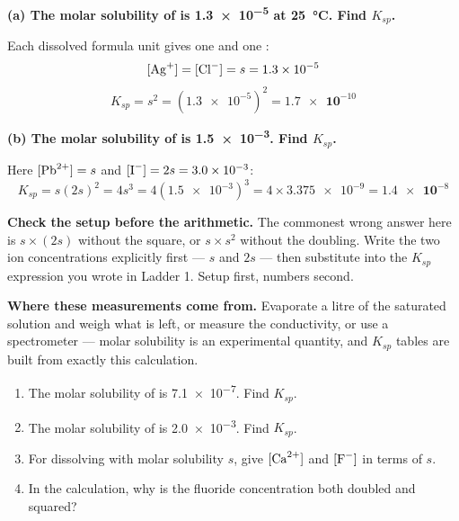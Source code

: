 \documentclass{apchem-worksheet}
\begin{document}
\begin{workedexample}
\textbf{(a) The molar solubility of  is
\SI{1.3e-5}{\Molar} at \SI{25}{\celsius}. Find $K_{sp}$.}

Each dissolved formula unit gives one  and one :
\[ [\ce{Ag+}] = [\ce{Cl-}] = s = \num{1.3e-5} \]
\[ K_{sp} = s^{2} = (\num{1.3e-5})^{2} = \mathbf{\num{1.7e-10}} \]

\textbf{(b) The molar solubility of  is
\SI{1.5e-3}{\Molar}. Find $K_{sp}$.}

Here $[\ce{Pb^2+}] = s$ and $[\ce{I-}] = 2s = \num{3.0e-3}$:
\[ K_{sp} = s(2s)^{2} = 4s^{3}
          = 4(\num{1.5e-3})^{3}
          = 4 \times \num{3.375e-9}
          = \mathbf{\num{1.4e-8}} \]

\textbf{Check the setup before the arithmetic.} The commonest wrong
answer here is $s \times (2s)$ without the square, or
$s \times s^{2}$ without the doubling. Write the two ion
concentrations explicitly first --- $s$ and $2s$ --- then substitute
into the $K_{sp}$ expression you wrote in Ladder 1. Setup first,
numbers second.

\textbf{Where these measurements come from.} Evaporate a litre of the
saturated solution and weigh what is left, or measure the conductivity,
or use a spectrometer --- molar solubility is an experimental quantity,
and $K_{sp}$ tables are built from exactly this calculation.
\end{workedexample}

\begin{yourturn}
\begin{enumerate}[leftmargin=*,itemsep=0.5em]
  \item The molar solubility of  is \SI{7.1e-7}{\Molar}.
        Find $K_{sp}$. \workspace[1.8cm]
  \item The molar solubility of  is \SI{2.0e-3}{\Molar}.
        Find $K_{sp}$. \workspace[2.0cm]
  \item For  dissolving with molar solubility $s$, give
        $[\ce{Ca^2+}]$ and $[\ce{F-}]$ in terms of $s$.
        \workspace[1.6cm]
  \item In the  calculation, why is the fluoride concentration
        both doubled and squared? \workspace[1.8cm]
\end{enumerate}
\end{yourturn}
\end{document}
